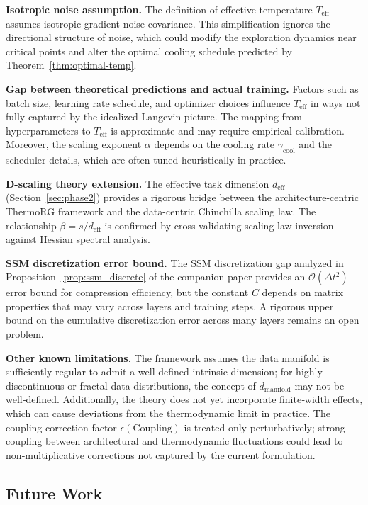 \documentclass[11pt, a4paper]{article}
\theoremstyle{definition}
\begin{document}
\textbf{Isotropic noise assumption.} The definition of effective temperature $T_{\text{eff}}$ assumes isotropic gradient noise covariance. This simplification ignores the directional structure of noise, which could modify the exploration dynamics near critical points and alter the optimal cooling schedule predicted by Theorem~\ref{thm:optimal-temp}.

\textbf{Gap between theoretical predictions and actual training.} Factors such as batch size, learning rate schedule, and optimizer choices influence $T_{\text{eff}}$ in ways not fully captured by the idealized Langevin picture. The mapping from hyperparameters to $T_{\text{eff}}$ is approximate and may require empirical calibration. Moreover, the scaling exponent $\alpha$ depends on the cooling rate $\gamma_{\text{cool}}$ and the scheduler details, which are often tuned heuristically in practice.

\textbf{D-scaling theory extension.} The effective task dimension $d_{\mathrm{eff}}$ (Section~\ref{sec:phase2}) provides a rigorous bridge between the architecture-centric ThermoRG framework and the data-centric Chinchilla scaling law. The relationship $\beta = s / d_{\mathrm{eff}}$ is confirmed by cross-validating scaling-law inversion against Hessian spectral analysis.

\textbf{SSM discretization error bound.} The SSM discretization gap analyzed in Proposition~\ref{prop:ssm_discrete} of the companion paper provides an $\mathcal{O}(\Delta t^2)$ error bound for compression efficiency, but the constant $C$ depends on matrix properties that may vary across layers and training steps. A rigorous upper bound on the cumulative discretization error across many layers remains an open problem.

\textbf{Other known limitations.} The framework assumes the data manifold is sufficiently regular to admit a well‑defined intrinsic dimension; for highly discontinuous or fractal data distributions, the concept of $d_{\text{manifold}}$ may not be well‑defined. Additionally, the theory does not yet incorporate finite‑width effects, which can cause deviations from the thermodynamic limit in practice. The coupling correction factor $\epsilon(\text{Coupling})$ is treated only perturbatively; strong coupling between architectural and thermodynamic fluctuations could lead to non‑multiplicative corrections not captured by the current formulation.


\subsection{Future Work}
\label{sec:future_work}
\end{document}

